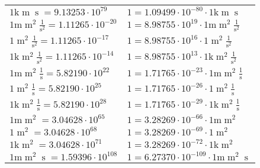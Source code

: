 \begin{center}
\begin{longtable}{l l}
{\color{gray}$1 \bm{\mathrm{ k}}{\operatorname{m}}{\operatorname{s}}{}{} = 9.13253\cdot10^{79} $}   & {\color{gray}$ 1 = 1.09499\cdot10^{-80} \cdot 1 \bm{\mathrm{ k}}{\operatorname{m}}{\operatorname{s}}{}{}$}  \\
{\color{gray}$1 \bm{\mathrm{ m}}{\operatorname{m}^2}\frac1{\operatorname{s}^2}{}{} = 1.11265\cdot10^{-20} $}   & {\color{gray}$ 1 = 8.98755\cdot10^{19} \cdot 1 \bm{\mathrm{ m}}{\operatorname{m}^2}\frac1{\operatorname{s}^2}{}{}$}  \\
{\color{black}$1 \bm{\mathrm{ }}{\operatorname{m}^2}\frac1{\operatorname{s}^2}{}{} = 1.11265\cdot10^{-17} $}   & {\color{black}$ 1 = 8.98755\cdot10^{16} \cdot 1 \bm{\mathrm{ }}{\operatorname{m}^2}\frac1{\operatorname{s}^2}{}{}$}  \\
{\color{gray}$1 \bm{\mathrm{ k}}{\operatorname{m}^2}\frac1{\operatorname{s}^2}{}{} = 1.11265\cdot10^{-14} $}   & {\color{gray}$ 1 = 8.98755\cdot10^{13} \cdot 1 \bm{\mathrm{ k}}{\operatorname{m}^2}\frac1{\operatorname{s}^2}{}{}$}  \\
{\color{gray}$1 \bm{\mathrm{ m}}{\operatorname{m}^2}\frac1{\operatorname{s}}{}{} = 5.82190\cdot10^{22} $}   & {\color{gray}$ 1 = 1.71765\cdot10^{-23} \cdot 1 \bm{\mathrm{ m}}{\operatorname{m}^2}\frac1{\operatorname{s}}{}{}$}  \\
{\color{black}$1 \bm{\mathrm{ }}{\operatorname{m}^2}\frac1{\operatorname{s}}{}{} = 5.82190\cdot10^{25} $}   & {\color{black}$ 1 = 1.71765\cdot10^{-26} \cdot 1 \bm{\mathrm{ }}{\operatorname{m}^2}\frac1{\operatorname{s}}{}{}$}  \\
{\color{gray}$1 \bm{\mathrm{ k}}{\operatorname{m}^2}\frac1{\operatorname{s}}{}{} = 5.82190\cdot10^{28} $}   & {\color{gray}$ 1 = 1.71765\cdot10^{-29} \cdot 1 \bm{\mathrm{ k}}{\operatorname{m}^2}\frac1{\operatorname{s}}{}{}$}  \\
{\color{gray}$1 \bm{\mathrm{ m}}{\operatorname{m}^2}{}{}{} = 3.04628\cdot10^{65} $}   & {\color{gray}$ 1 = 3.28269\cdot10^{-66} \cdot 1 \bm{\mathrm{ m}}{\operatorname{m}^2}{}{}{}$}  \\
{\color{black}$1 \bm{\mathrm{ }}{\operatorname{m}^2}{}{}{} = 3.04628\cdot10^{68} $}   & {\color{black}$ 1 = 3.28269\cdot10^{-69} \cdot 1 \bm{\mathrm{ }}{\operatorname{m}^2}{}{}{}$}  \\
{\color{gray}$1 \bm{\mathrm{ k}}{\operatorname{m}^2}{}{}{} = 3.04628\cdot10^{71} $}   & {\color{gray}$ 1 = 3.28269\cdot10^{-72} \cdot 1 \bm{\mathrm{ k}}{\operatorname{m}^2}{}{}{}$}  \\
{\color{gray}$1 \bm{\mathrm{ m}}{\operatorname{m}^2}{\operatorname{s}}{}{} = 1.59396\cdot10^{108} $}   & {\color{gray}$ 1 = 6.27370\cdot10^{-109} \cdot 1 \bm{\mathrm{ m}}{\operatorname{m}^2}{\operatorname{s}}{}{}$}  \\

\end{longtable}
\end{center}
